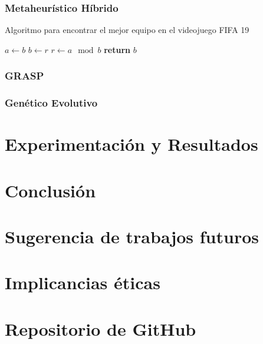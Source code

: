 \documentclass[11pt, twocolumn]{article}
\begin{document}
\subsubsection{Metaheurístico Híbrido}

\renewcommand{\thealgorithm}{}
\begin{algorithm}[H]
    \caption{Algoritmo para encontrar el mejor equipo en el videojuego FIFA 19}\label{euclid}
    \begin{algorithmic}[1]
         
            \State {}
                \State $a \gets b$
                \State $b \gets r$
                \State $r \gets a \mod b$
            \EndWhile
            \State \textbf{return} $b$ 
        \EndProcedure
    \end{algorithmic}
\end{algorithm}

\subsubsection{GRASP}

\subsubsection{Genético Evolutivo}

\section{Experimentación y Resultados}

\section{Conclusión}

\section{Sugerencia de trabajos futuros}

\section{Implicancias éticas}

\section{Repositorio de GitHub}
\end{document}
